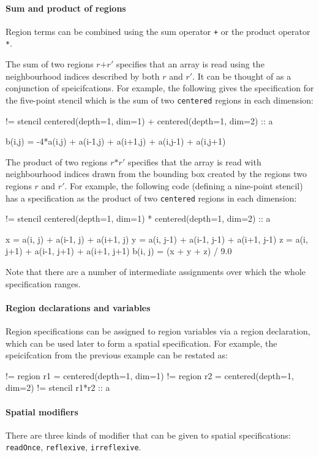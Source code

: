 \documentclass[9pt]{sigplanconf}
\theoremstyle{definition}
\newcommand{\term}[1]{\texttt{#1}}
\begin{document}
\paragraph{Sum and product of regions}
Region terms can be combined using the sum operator
\term{+} or the product operator \term{*}. 

The sum of two regions $r \texttt{+} r'$ specifies that an array is
read using the neighbourhood indices described by both $r$ and
$r'$. It can be thought of as a conjunction of speicifcations. For
example, the following gives the specification for the five-point
stencil which is the sum of two \texttt{centered} regions in each
dimension:
\begin{ExmVerbatim}
!= stencil centered(depth=1, dim=1) 
         + centered(depth=1, dim=2) :: a

b(i,j) = -4*a(i,j) + a(i-1,j) + a(i+1,j) 
                   + a(i,j-1) + a(i,j+1) 
\end{ExmVerbatim}
The product of two regions $r \texttt{*} r'$ specifies that the array
is read with neighbourhood indices drawn from the bounding box created
by the regions two regions $r$ and $r'$. For example, the following
code (defining a nine-point stencil) has a specification as the
product of two \texttt{centered} regions in each dimension:
\begin{ExmVerbatim}
!= stencil centered(depth=1, dim=1) 
         * centered(depth=1, dim=2) :: a

x = a(i, j)   + a(i-1, j)   + a(i+1, j)
y = a(i, j-1) + a(i-1, j-1) + a(i+1, j-1)
z = a(i, j+1) + a(i-1, j+1) + a(i+1, j+1)
b(i, j) = (x + y + z) / 9.0
\end{ExmVerbatim}
Note that there are a number of intermediate assignments over which 
the whole specification ranges. 

\paragraph{Region declarations and variables}

Region specifications can be assigned to region variables via
a region declaration, which can be used later to form a spatial
specification. For example, the speicifcation from the previous
 example can be restated as:
\begin{ExmVerbatim}
!= region r1 = centered(depth=1, dim=1) 
!= region r2 = centered(depth=1, dim=2)
!= stencil r1*r2 :: a
\end{ExmVerbatim}
\paragraph{Spatial modifiers}
There are three kinds of modifier that can be given to spatial 
specifications: \texttt{readOnce}, \texttt{reflexive}, 
\texttt{irreflexive}. 
\end{document}
